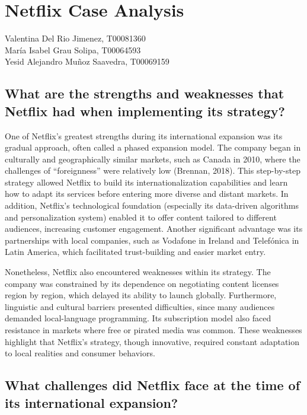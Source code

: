 \documentclass[letterpaper, 12pt]{report}
\begin{document}
\nocite{*}

\chapter*{Netflix Case Analysis}

\noindent
Valentina Del Rio Jimenez, T00081360 \\
María Isabel Grau Solipa, T00064593 \\
Yesid Alejandro Muñoz Saavedra, T00069159 \\

\section{What are the strengths and weaknesses that Netflix had when implementing its strategy? }

One of Netflix’s greatest strengths during its international expansion was its
gradual approach, often called a phased expansion model. The company began in
culturally and geographically similar markets, such as Canada in 2010, where
the challenges of “foreignness” were relatively low (Brennan, 2018). This
step-by-step strategy allowed Netflix to build its internationalization
capabilities and learn how to adapt its services before entering more diverse
and distant markets. In addition, Netflix’s technological foundation
(especially its data-driven algorithms and personalization system) enabled it
to offer content tailored to different audiences, increasing customer
engagement. Another significant advantage was its partnerships with local
companies, such as Vodafone in Ireland and Telefónica in Latin America, which
facilitated trust-building and easier market entry.

Nonetheless, Netflix also encountered weaknesses within its strategy. The
company was constrained by its dependence on negotiating content licenses
region by region, which delayed its ability to launch globally. Furthermore,
linguistic and cultural barriers presented difficulties, since many audiences
demanded local-language programming. Its subscription model also faced
resistance in markets where free or pirated media was common. These weaknesses
highlight that Netflix’s strategy, though innovative, required constant
adaptation to local realities and consumer behaviors.

\section{What challenges did Netflix face at the time of its international expansion?}
\end{document}
